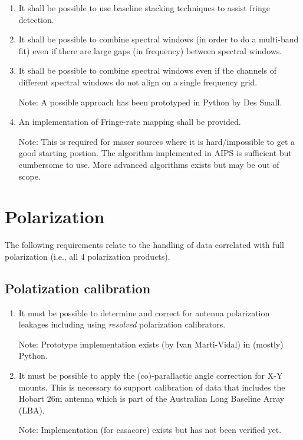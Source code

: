 \documentclass[11pt,a4paper]{article}
\begin{document}
\begin{enumerate}[subseclist]
\item It shall be possible to use baseline stacking techniques to
  assist fringe detection.

\item It shall be possible to combine spectral windows (in order to do
  a multi-band fit) even if there are large gaps (in frequency)
  between spectral windows.

\item It shall be possible to combine spectral windows even if the
  channels of different spectral windows do not align on a single
  frequency grid.

  Note: A possible approach has been prototyped in Python by Des Small.

\item An implementation of Fringe-rate mapping shall be provided.

  Note: This is required for maser sources where it is hard/impossible
  to get a good starting postion.  The algorithm implemented in AIPS
  is sufficient but cumbersome to use.  More advanced algorithms
  exists but may be out of scope.

\end{enumerate}


\section{Polarization}

The following requirements relate to the handling of data correlated
with full polarization (i.e., all 4 polarization products).

\subsection{ Polatization calibration}

\begin{enumerate}[subseclist]

\item It must be possible to determine and correct for antenna
  polarization leakages including using \emph{resolved} polarization
  calibrators.

  Note: Prototype implementation exists (by Ivan Marti-Vidal) in
  (mostly) Python.

\item It must be possible to apply the (co)-parallactic angle
  correction for X-Y mounts.  This is necessary to support calibration
  of data that includes the Hobart 26m antenna which is part of the
  Australian Long Baseline Array (LBA).

  Note: Implementation (for casacore) exists but has not been verified yet.

\end{enumerate}
\end{document}
